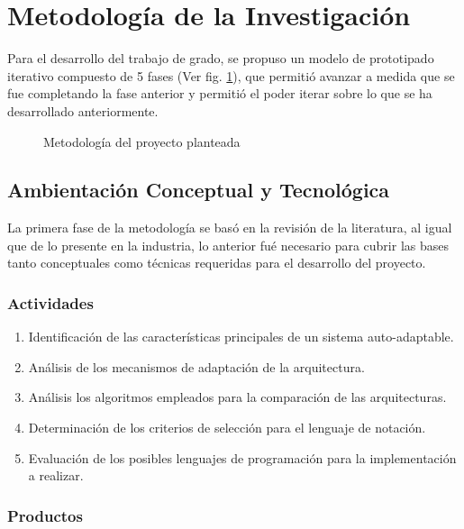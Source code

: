 \section{Metodología de la Investigación}

Para el desarrollo del trabajo de grado, se propuso un modelo de prototipado iterativo compuesto de 5 fases (Ver fig. \ref{fig:met}), que permitió avanzar a medida que se fue completando la fase anterior y permitió el poder iterar sobre lo que se ha desarrollado anteriormente.

\begin{figure}[H]
    \centering
    \caption{Metodología del proyecto planteada}
    
    \label{fig:met}
\end{figure}

\subsection{Ambientación Conceptual y Tecnológica}

La primera fase de la metodología se basó en la revisión de la literatura, al igual que de lo presente en la industria, lo anterior fué necesario para cubrir las bases tanto conceptuales como técnicas requeridas para el desarrollo del proyecto. 

\subsubsection*{Actividades}

\begin{enumerate}
    \itemsep-2mm
    \item Identificación de las características principales de un sistema auto-adaptable.
    \item Análisis de los mecanismos de adaptación de la arquitectura.
    \item Análisis los algoritmos empleados para la comparación de las arquitecturas.
    \item Determinación de los criterios de selección para el lenguaje de notación.
    \item Evaluación de los posibles lenguajes de programación para la implementación a realizar.
\end{enumerate} 

\subsubsection*{Productos}

